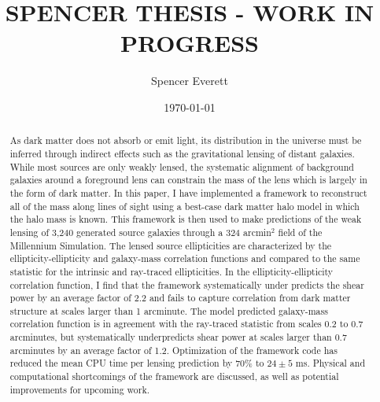 \documentclass[%
 reprint,
 amsmath,amssymb,
 aps,nofootinbib
]{revtex4-1}
\begin{document}

\title{SPENCER THESIS - WORK IN PROGRESS}

\author{Spencer Everett}


\date{\today}

\begin{abstract}
As dark matter does not absorb or emit light, its distribution in the universe must be inferred through indirect effects such as the gravitational lensing of distant galaxies. While most sources are only weakly lensed, the systematic alignment of background galaxies around a foreground lens can constrain the mass of the lens which is largely in the form of dark matter. In this paper, I have implemented a framework to reconstruct all of the mass along lines of sight using a  best-case dark matter halo model in which the halo mass is known. This framework is then used to make predictions of the weak lensing of 3,240 generated source galaxies through a 324 arcmin$^2$ field of the Millennium Simulation. The lensed source ellipticities are characterized by the ellipticity-ellipticity and galaxy-mass correlation functions and compared to the same statistic for the intrinsic and ray-traced ellipticities. In the ellipticity-ellipticity correlation function, I find that the framework systematically under predicts the shear power by an average factor of 2.2 and fails to capture correlation from dark matter structure at scales larger than 1 arcminute. The model predicted galaxy-mass correlation function is in agreement with the ray-traced statistic from scales 0.2 to 0.7 arcminutes, but systematically underpredicts shear power at scales larger than 0.7 arcminutes by an average factor of 1.2. Optimization of the framework code has reduced the mean CPU time per lensing prediction by 70\% to $24\pm5$ ms. Physical and computational shortcomings of the framework are discussed, as well as potential improvements for upcoming work.
\end{abstract}

\maketitle
\end{document}
